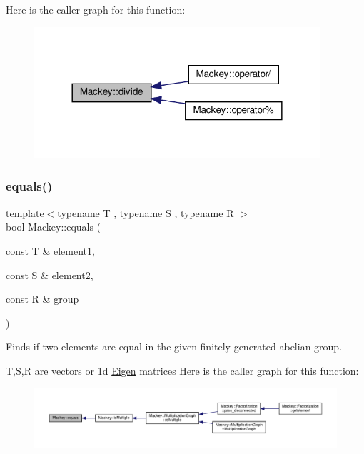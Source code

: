 Here is the caller graph for this function\+:\nopagebreak
\begin{figure}[H]
\begin{center}
\leavevmode
\includegraphics[width=300pt]{namespaceMackey_a04fadcf186ab504cafeb259178ee4827_icgraph}
\end{center}
\end{figure}
\mbox{\label{namespaceMackey_a82dd9e46100ec78b6238a3b60a5b1b45}} 
\subsubsection{\texorpdfstring{equals()}{equals()}}
{\footnotesize\ttfamily template$<$typename T , typename S , typename R $>$ \\
bool Mackey\+::equals (\begin{DoxyParamCaption}\item[{const T \&}]{element1,  }\item[{const S \&}]{element2,  }\item[{const R \&}]{group }\end{DoxyParamCaption})}



Finds if two elements are equal in the given finitely generated abelian group. 

T,S,R are vectors or 1d \hyperlink{namespaceEigen}{Eigen} matrices Here is the caller graph for this function\+:\nopagebreak
\begin{figure}[H]
\begin{center}
\leavevmode
\includegraphics[width=350pt]{namespaceMackey_a82dd9e46100ec78b6238a3b60a5b1b45_icgraph}
\end{center}
\end{figure}
\mbox{\label{namespaceMackey_a91104eaef1ab349e68f0623cfaaf45c0}} 
